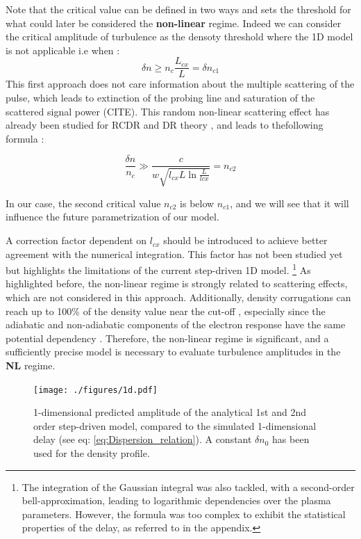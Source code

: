 \documentclass[11pt,a4paper,openany]{report}
\begin{document}
\begin{multicols}{2}
    Note that the critical value can be defined in two ways \cite{SPR_Krutkin, PUT} and sets the threshold for what could later be considered the \textbf{non-linear} regime. Indeed we can consider the critical amplitude of turbulence as the densoty threshold where the 1D model is not applicable i.e when : $$\delta n \geq n_c \frac{L_{cx}}{L} = \delta n_{c 1}$$ This first approach does not care information about the multiple scattering of the pulse, which leads to extinction of the probing line and saturation of the scattered signal power (CITE). This random non-linear scattering effect has already been studied for RCDR and DR theory \cite{critical2}, and leads to thefollowing formula :

    $$ \frac{\delta n}{n_c} \gg  \frac{c}{w\sqrt{l_{cx}L\ln{\frac{L}{lcx}}}} = n_{c2}$$

    In our case, the second critical value $n_{c 2}$ is below $n_{c 1}$, and we will see that it will influence the future parametrization of our model.

    A correction factor dependent on $l_{cx}$ should be introduced to achieve better agreement with the numerical integration. This factor has not been studied yet but highlights the limitations of the current step-driven 1D model. \footnote{The integration of the Gaussian integral was also tackled, with a second-order bell-approximation, leading to logarithmic dependencies over the plasma parameters. However, the formula was too complex to exhibit the statistical properties of the delay, as referred to in the appendix.} As highlighted before, the non-linear regime is strongly related to scattering effects, which are not considered in this approach. Additionally, density corrugations can reach up to 100\% of the density value near the cut-off \cite{Krutkin_thesis,San_diego}, especially since the adiabatic and non-adiabatic components of the electron response have the same potential dependency \cite{San_diego}. Therefore, the non-linear regime is significant, and a sufficiently precise model is necessary to evaluate turbulence amplitudes in the \textbf{NL} regime.

    \begin{figure}[H]
        \centering
        \hspace*{-0.2cm}\texttt{[image: ./figures/1d.pdf]}
        \caption{1-dimensional predicted amplitude of the analytical 1st and 2nd order step-driven model, compared to the simulated 1-dimensional delay (see eq: \ref{eq:Dispersion_relation}). A constant \(\delta n_0\) has been used for the density profile.}
        \label{fig:std_delay}
    \end{figure}


\end{multicols}
\end{document}
